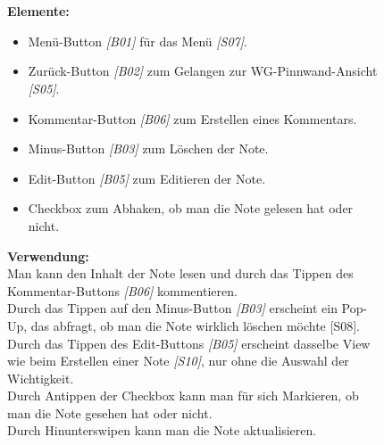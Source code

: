 \documentclass[a4paper]{scrreprt}
\begin{document}
\begin{figure}[h]
\begin{minipage}[b]{0.55\linewidth}
    			\\
    			\hfill
    			\\\textbf{Elemente:}\\
    			\begin{itemize}
    				\renewcommand\labelitemi{--}
    				\item  Menü-Button \textit{{[}B01{]}} für das Menü \textit{{[}S07{]}}.
    				\item Zurück-Button \textit{{[}B02{]}} zum Gelangen zur
    				WG-Pinnwand-Ansicht \textit{{[}S05{]}}.
    				\item Kommentar-Button \textit{{[}B06{]}} zum Erstellen eines
    				Kommentars.
    				\item Minus-Button \textit{{[}B03{]}} zum Löschen der Note.
    				\item Edit-Button \textit{{[}B05{]}} zum Editieren der Note.
    				\item Checkbox zum Abhaken, ob man die Note gelesen hat oder nicht.
    				
    			\end{itemize}
    			
    			\hfill
    			
    			\textbf{Verwendung:}\\
    			Man kann den Inhalt der Note lesen und durch
    			das Tippen des Kommentar-Buttons \textit{{[}B06{]}}
    			kommentieren. \\
    			Durch das Tippen auf den 
    			Minus-Button \textit{{[}B03{]}} erscheint ein Pop-Up, das abfragt, ob man die Note wirklich löschen möchte {[}S08{]}.\\
    			Durch das Tippen des Edit-Buttons \textit{{[}B05{]}} erscheint
    			dasselbe View wie beim Erstellen einer Note \textit{{[}S10{]}}, nur ohne die Auswahl der Wichtigkeit.\\ Durch Antippen der Checkbox kann man für sich Markieren, ob man die Note gesehen hat oder nicht.\\
    			Durch Hinunterswipen kann man die Note aktualisieren.
    			
    		\end{minipage}
    	\end{figure}
    	
    	\clearpage
    	
\end{document}
